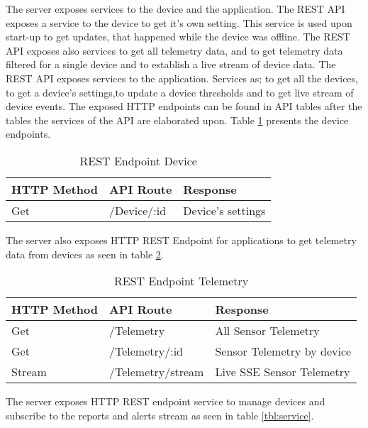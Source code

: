 The server exposes services to the device and the application. The REST API exposes a service to the device to get it's own setting. This service is used upon start-up to get updates, that happened while the device was offline. 
The REST API exposes also services to get all telemetry data, and to get telemetry data filtered for a single device and to establish a live stream of device data. 
The REST API exposes services to the application. Services as; to get all the devices, to get a device's settings,to update a device thresholds and to get live stream of device events. The exposed HTTP endpoints can be found in API tables after the tables the services of the API are elaborated upon. Table \ref{tbl:device} presents the device endpoints. 

\begin{table}[H]
    \centering
    \begin{tabular}{|l|l|l|}
    \hline
    \textbf{HTTP Method}    & \textbf{API Route} & \textbf{Response} \\ \hline
    Get & /Device/:id & Device's settings  \\ \hline
    \end{tabular}
    \caption{REST Endpoint Device}
    \label{tbl:device}
\end{table}
The server also exposes HTTP REST Endpoint for applications to get telemetry data from devices as seen in table \ref{tbl:telemetry}.

\begin{table}[H]
    \centering
    \begin{tabular}{|l|l|p{5cm}|}
    \hline
    \textbf{HTTP Method}    & \textbf{API Route} & \textbf{Response} \\ \hline
    Get & /Telemetry & All Sensor Telemetry  \\ \hline
    Get & /Telemetry/:id & Sensor Telemetry by device \\ \hline
    Stream & /Telemetry/stream & Live SSE Sensor Telemetry  \\ \hline
    \end{tabular}
    \caption{REST Endpoint Telemetry}
    \label{tbl:telemetry}
\end{table}
The server exposes HTTP REST endpoint service to manage devices and subscribe to the reports and alerts stream as seen in table \ref{tbl:service}.

